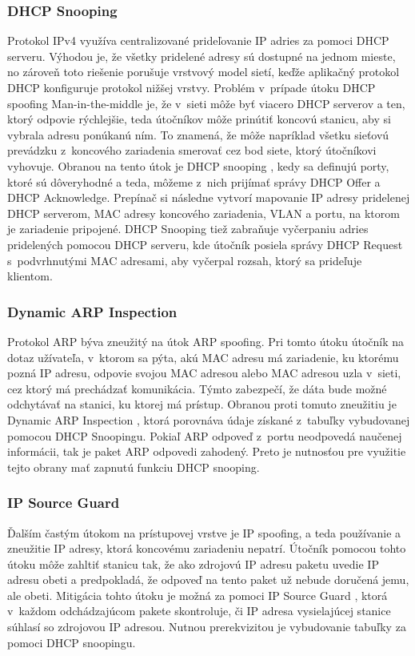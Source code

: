 \subsubsection*{DHCP Snooping}
Protokol IPv4 využíva centralizované prideľovanie IP adries za pomoci DHCP serveru. Výhodou je, že všetky pridelené adresy sú dostupné na jednom mieste, no zároveň toto riešenie porušuje vrstvový model sietí, keďže aplikačný protokol DHCP konfiguruje protokol nižšej vrstvy. Problém v~prípade útoku DHCP spoofing Man-in-the-middle je, že v~sieti môže byť viacero DHCP serverov a ten, ktorý odpovie rýchlejšie, teda útočníkov môže prinútiť koncovú stanicu, aby si vybrala adresu ponúkanú ním. To znamená, že môže napríklad všetku sieťovú prevádzku z~koncového zariadenia smerovať cez bod siete, ktorý útočníkovi vyhovuje. Obranou na tento útok je DHCP snooping \cite{Vyncke2008} \cite{Singh2018}, kedy sa definujú porty, ktoré sú dôveryhodné a teda, môžeme z~nich prijímať správy DHCP Offer a DHCP Acknowledge. Prepínač si následne vytvorí mapovanie IP adresy pridelenej DHCP serverom, MAC adresy koncového zariadenia, VLAN a portu, na ktorom je zariadenie pripojené. DHCP Snooping tiež zabraňuje vyčerpaniu adries pridelených pomocou DHCP serveru, kde útočník posiela správy DHCP Request s~podvrhnutými MAC adresami, aby vyčerpal rozsah, ktorý sa prideľuje klientom.

\subsubsection*{Dynamic ARP Inspection}
Protokol ARP býva zneužitý na útok ARP spoofing. Pri tomto útoku útočník na dotaz užívateľa, v~ktorom sa pýta, akú MAC adresu má zariadenie, ku ktorému pozná IP adresu, odpovie svojou MAC adresou alebo MAC adresou uzla v~sieti, cez ktorý má prechádzať komunikácia. Týmto zabezpečí, že dáta bude možné odchytávať na stanici, ku ktorej má prístup. Obranou proti tomuto zneužitiu je Dynamic ARP Inspection \cite{McMillan2018}, ktorá porovnáva údaje získané z~tabuľky vybudovanej pomocou DHCP Snoopingu. Pokiaľ ARP odpoveď z~portu neodpovedá naučenej informácii, tak je paket ARP odpovedi zahodený. Preto je nutnosťou pre využitie tejto obrany mať zapnutú funkciu DHCP snooping.

\subsubsection*{IP Source Guard}
Ďalším častým útokom na prístupovej vrstve je IP spoofing, a teda používanie a zneužitie IP adresy, ktorá koncovému zariadeniu nepatrí. Útočník pomocou tohto útoku môže zahltiť stanicu tak, že ako zdrojovú IP adresu paketu uvedie IP adresu obeti a predpokladá, že odpoveď na tento paket už nebude doručená jemu, ale obeti. Mitigácia tohto útoku je možná za pomoci IP Source Guard \cite{Singh2018}, ktorá v~každom odchádzajúcom pakete skontroluje, či IP adresa vysielajúcej stanice súhlasí so zdrojovou IP adresou. Nutnou prerekvizitou je vybudovanie tabuľky za pomoci DHCP snoopingu.    

